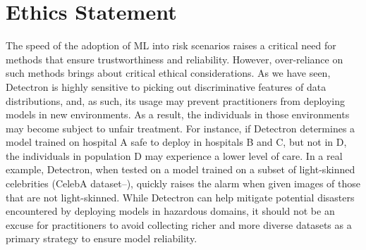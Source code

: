 \section*{Ethics Statement}
The speed of the adoption of ML into risk scenarios raises a critical need for methods that ensure trustworthiness and reliability.
However, over-reliance on such methods brings about critical ethical considerations.
As we have seen, Detectron is highly sensitive to picking out discriminative features of data distributions, and, as such, its usage may prevent practitioners from deploying models in new environments.
As a result, the individuals in those environments may become subject to unfair treatment.
For instance, if Detectron determines a model trained on hospital A safe to deploy in hospitals B and C, but not in D, the individuals in population D may experience a lower level of care.
In a real example, Detectron, when tested on a model trained on a subset of light-skinned celebrities (CelebA dataset--\cite{liu2015faceattributes}), quickly raises the alarm when given images of those that are not light-skinned.
While Detectron can help mitigate potential disasters encountered by deploying models in hazardous domains, it should not be an excuse for practitioners to avoid collecting richer and more diverse datasets as a primary strategy to ensure model reliability.
